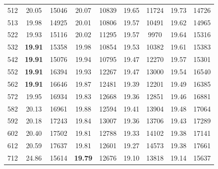 \begin{table}[]
\begin{center}
\begin{tabular}{@{}lcccccccc@{}}
512    & 20.05                           & 15046 & 20.07                           & 10839 & 19.65                           & 11724 & 19.73                           & 14726 \\
513    & 19.98                           & 14925 & 20.01                           & 10806 & 19.57                           & 10491 & 19.62                           & 14965 \\
522    & 19.93                           & 15116 & 20.02                           & 11295 & 19.57                           & 9970  & 19.64                           & 15316 \\
532    & \textbf{19.91} & 15358 & 19.98                           & 10854 & 19.53                           & 10382 & 19.61                           & 15383 \\
542    & \textbf{19.91} & 15076 & 19.94                           & 10795 & 19.47                           & 12270 & 19.57                           & 15301 \\
552    & \textbf{19.91} & 16394 & 19.93                           & 12267 & 19.47                           & 13000 & 19.54                           & 16540 \\
562    & \textbf{19.91} & 16646 & 19.87                           & 12481 & 19.39                           & 12201 & 19.49                           & 16385 \\
572    & 19.95                           & 16934 & 19.83                           & 12668 & 19.36                           & 12851 & 19.46                           & 16881 \\
582    & 20.13                           & 16961 & 19.88                           & 12594 & 19.41                           & 13904 & 19.48                           & 17064 \\
592    & 20.18                           & 17243 & 19.84                           & 13007 & 19.36                           & 13706 & 19.43                           & 17289 \\
602    & 20.40                           & 17502 & 19.81                           & 12788 & 19.33                           & 14102 & 19.38                           & 17141 \\
612    & 20.59                           & 17637 & 19.81                           & 12601 & 19.27                           & 14573 & 19.38                           & 17661 \\
712    & 24.86                           & 15614 & \textbf{19.79} & 12676 & 19.10                           & 13818 & 19.14                           & 15637 \\

\end{tabular}
\end{center}
\end{table}
